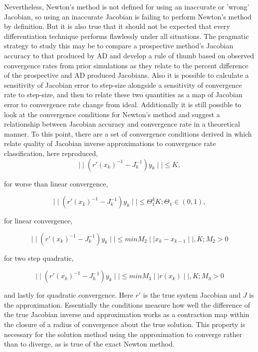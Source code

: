 \documentclass[preprint,12pt]{elsarticle}
\begin{document}
Nevertheless, Newton's method is not defined for using an inaccurate or 'wrong'
Jacobian, so using an inaccurate Jacobian is failing to perform Newton's method
by definition. But it is also true that it should not be expected that every
differentiation technique performs flawlessly under all situations. The
pragmatic strategy to study this may be to compare a prospective method's
Jacobian accuracy to that produced by AD and develop a rule of thumb based on
observed convergence rates from prior simulations as they relate to the percent
difference of the prospective and AD produced Jacobians. Also it is possible to
calculate a sensitivity of Jacobian error to step-size alongside a sensitivity
of convergence rate to step-size, and then to relate these two quantities as a
map of Jacobian error to convergence rate change from ideal. Additionally it is
still possible to look at the convergence conditions for Newton's method and
suggest a relationship between Jacobian accuracy and convergence rate in a
theoretical manner. To this point, there are a set of convergence conditions derived in
\cite[Chap. 2, p.41]{burkeLectures} which relate quality of Jacobian inverse approximations
to convergence rate classification, here reproduced,
%
\begin{equation} \mid \mid (r \prime (x_{k})^{-1} - J_{k}^{-1})y_{k} \mid \mid \leq K,
\end{equation}

for worse than linear convergence,

\begin{equation} \mid \mid (r \prime (x_{k})^{-1} - J_{k}^{-1})y_{k} \mid \mid \leq \Theta_{1}^{k}K; \Theta_{1} \in (0,1),
\end{equation}

for linear convergence,

\begin{equation} \mid \mid (r \prime (x_{k})^{-1} - J_{k}^{-1})y_{k} \mid \mid \leq min{M_{2} \mid \mid x_{k} - x_{k-1} \mid \mid, K}; M_{2} > 0
\end{equation}

for two step quadratic,

\begin{equation} \mid \mid (r \prime (x_{k})^{-1} - J_{k}^{-1})y_{k} \mid \mid \leq min{M_{3} \mid \mid r(x_{k}) \mid \mid, K}; M_{3} > 0
\end{equation}

and lastly for quadratic convergence. Here $r \prime$ is the true system
Jacobian and $J$ is the approximation. Essentially the conditions measure how
well the difference of the true Jacobian inverse and approximation works as
a contraction map within the closure of a radius of convergence about the true
solution. This property is necessary for the solution method using the
approximation to converge rather than to diverge, as is true of the exact Newton
method.
\end{document}
